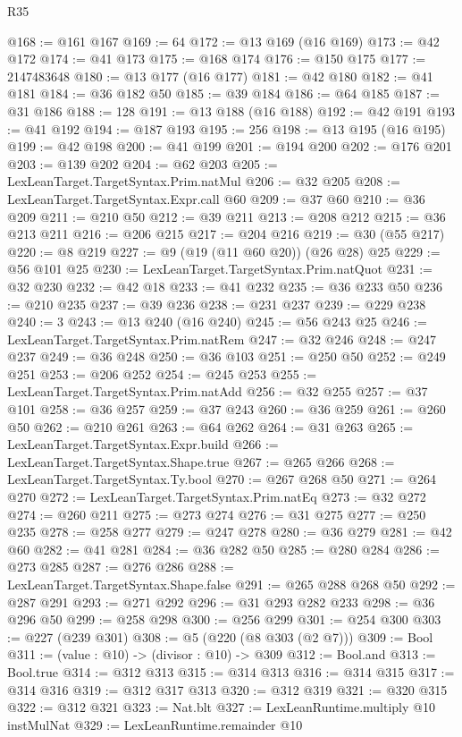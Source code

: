 \begin{lexlean}{R35}
\begin{coremodule}
@168 := @161 @167
@169 := 64
@172 := @13 @169 (@16 @169)
@173 := @42 @172
@174 := @41 @173
@175 := @168 @174
@176 := @150 @175
@177 := 2147483648
@180 := @13 @177 (@16 @177)
@181 := @42 @180
@182 := @41 @181
@184 := @36 @182 @50
@185 := @39 @184
@186 := @64 @185
@187 := @31 @186
@188 := 128
@191 := @13 @188 (@16 @188)
@192 := @42 @191
@193 := @41 @192
@194 := @187 @193
@195 := 256
@198 := @13 @195 (@16 @195)
@199 := @42 @198
@200 := @41 @199
@201 := @194 @200
@202 := @176 @201
@203 := @139 @202
@204 := @62 @203
@205 := LexLeanTarget.TargetSyntax.Prim.natMul
@206 := @32 @205
@208 := LexLeanTarget.TargetSyntax.Expr.call @60
@209 := @37 @60
@210 := @36 @209
@211 := @210 @50
@212 := @39 @211
@213 := @208 @212
@215 := @36 @213 @211
@216 := @206 @215
@217 := @204 @216
@219 := @30 (@55 @217)
@220 := @8 @219
@227 := @9 (@19 (@11 @60 @20)) (@26 @28) @25
@229 := @56 @101 @25
@230 := LexLeanTarget.TargetSyntax.Prim.natQuot
@231 := @32 @230
@232 := @42 @18
@233 := @41 @232
@235 := @36 @233 @50
@236 := @210 @235
@237 := @39 @236
@238 := @231 @237
@239 := @229 @238
@240 := 3
@243 := @13 @240 (@16 @240)
@245 := @56 @243 @25
@246 := LexLeanTarget.TargetSyntax.Prim.natRem
@247 := @32 @246
@248 := @247 @237
@249 := @36 @248
@250 := @36 @103
@251 := @250 @50
@252 := @249 @251
@253 := @206 @252
@254 := @245 @253
@255 := LexLeanTarget.TargetSyntax.Prim.natAdd
@256 := @32 @255
@257 := @37 @101
@258 := @36 @257
@259 := @37 @243
@260 := @36 @259
@261 := @260 @50
@262 := @210 @261
@263 := @64 @262
@264 := @31 @263
@265 := LexLeanTarget.TargetSyntax.Expr.build
@266 := LexLeanTarget.TargetSyntax.Shape.true
@267 := @265 @266
@268 := LexLeanTarget.TargetSyntax.Ty.bool
@270 := @267 @268 @50
@271 := @264 @270
@272 := LexLeanTarget.TargetSyntax.Prim.natEq
@273 := @32 @272
@274 := @260 @211
@275 := @273 @274
@276 := @31 @275
@277 := @250 @235
@278 := @258 @277
@279 := @247 @278
@280 := @36 @279
@281 := @42 @60
@282 := @41 @281
@284 := @36 @282 @50
@285 := @280 @284
@286 := @273 @285
@287 := @276 @286
@288 := LexLeanTarget.TargetSyntax.Shape.false
@291 := @265 @288 @268 @50
@292 := @287 @291
@293 := @271 @292
@296 := @31 @293 @282 @233
@298 := @36 @296 @50
@299 := @258 @298
@300 := @256 @299
@301 := @254 @300
@303 := @227 (@239 @301)
@308 := @5 (@220 (@8 @303 (@2 @7)))
@309 := Bool
@311 := (value : @10) -> (divisor : @10) -> @309
@312 := Bool.and
@313 := Bool.true
@314 := @312 @313
@315 := @314 @313
@316 := @314 @315
@317 := @314 @316
@319 := @312 @317 @313
@320 := @312 @319
@321 := @320 @315
@322 := @312 @321
@323 := Nat.blt
@327 := LexLeanRuntime.multiply @10 instMulNat
@329 := LexLeanRuntime.remainder @10

\end{coremodule}
\end{lexlean}
